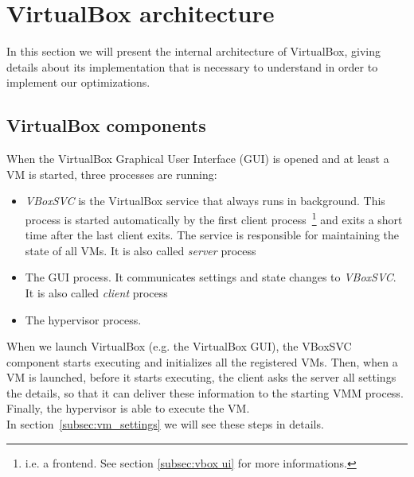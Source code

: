 \documentclass[a4paper, 12pt, titlepage]{report}
\begin{document}
\section{VirtualBox architecture} \label{sec:architecture}
In this section we will present the internal architecture of VirtualBox, giving details about its implementation that is necessary to understand in order to implement our optimizations.

\subsection{VirtualBox components} \label{subsec:components}
When the VirtualBox Graphical User Interface (GUI) is opened and at least a VM is started, three processes are running:
\begin{itemize}
\item \textit{VBoxSVC} is the VirtualBox service that always runs in background. This process is started automatically by the first client process~\footnote{i.e. a frontend. See section \ref{subsec:vbox ui} for more informations.} and exits a short time after the last client exits. The service is responsible for maintaining the state of all VMs. It is also called \textit{server} process
\item The GUI process. It communicates settings and state changes to \textit{VBoxSVC}. It is also called \textit{client} process
\item The hypervisor process.
\end{itemize}
When we launch VirtualBox (e.g. the VirtualBox GUI), the VBoxSVC component starts executing and initializes all the registered VMs. Then, when a VM is launched, before it starts executing, the client asks the server all settings the details, so that it can deliver these information to the starting VMM process. Finally, the hypervisor is able to execute the VM.
\\
In section~\ref{subsec:vm_settings} we will see these steps in details.
\end{document}
